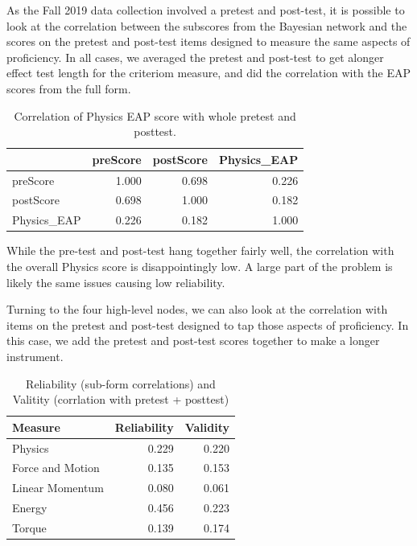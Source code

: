 \documentclass[]{article}
\begin{document}
As the Fall 2019 data collection involved a pretest and post-test, it is
possible to look at the correlation between the subscores from the
Bayesian network and the scores on the pretest and post-test items
designed to measure the same aspects of proficiency. In all cases, we
averaged the pretest and post-test to get alonger effect test length for
the criteriom measure, and did the correlation with the EAP scores from
the full form.

\begin{table}

\caption{\label{tab:Cormat}Correlation of Physics EAP score with whole pretest and posttest.}
\centering
\begin{tabular}[t]{lrrr}
\toprule
  & preScore & postScore & Physics\_EAP\\
\midrule
preScore & 1.000 & 0.698 & 0.226\\
postScore & 0.698 & 1.000 & 0.182\\
Physics\_EAP & 0.226 & 0.182 & 1.000\\
\bottomrule
\end{tabular}
\end{table}

While the pre-test and post-test hang together fairly well, the
correlation with the overall Physics score is disappointingly low. A
large part of the problem is likely the same issues causing low
reliability.

Turning to the four high-level nodes, we can also look at the
correlation with items on the pretest and post-test designed to tap
those aspects of proficiency. In this case, we add the pretest and
post-test scores together to make a longer instrument.

\begin{table}

\caption{\label{tab:Validity}Reliability (sub-form correlations) and Valitity (corrlation with pretest + posttest)}
\centering
\begin{tabular}[t]{lrr}
\toprule
Measure & Reliability & Validity\\
\midrule
Physics & 0.229 & 0.220\\
Force and Motion & 0.135 & 0.153\\
Linear Momentum & 0.080 & 0.061\\
Energy & 0.456 & 0.223\\
Torque & 0.139 & 0.174\\
\bottomrule
\end{tabular}
\end{table}
\end{document}
